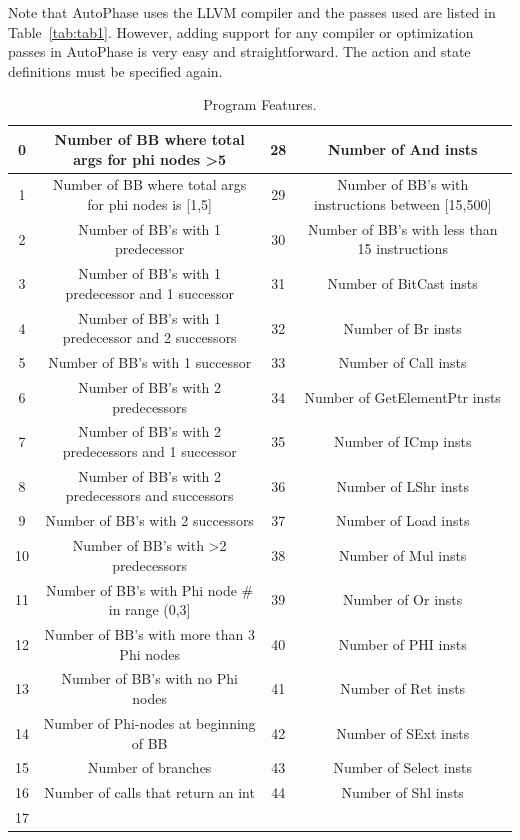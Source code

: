 Note that AutoPhase uses the LLVM compiler and the passes used are listed in Table~\ref{tab:tab1}. However, adding support for any compiler or optimization passes in AutoPhase is very easy and straightforward. The action and state definitions must be specified again. 

\begin{table}[!t]
\scriptsize
\centering
\caption{Program Features.}
\begin{tabular}{
|c|c|c|c|}
\hline 0&
Number of BB where total args for phi nodes \textgreater 5 & 28&  Number of And insts \\ \hline 1&
Number of BB where total args for phi nodes is {[}1,5{]} & 29&  Number of BB's with instructions between {[}15,500{]} \\ \hline 2&
Number of BB's with 1 predecessor & 30&  Number of BB's with less than 15 instructions \\ \hline 3&
Number of BB's with 1 predecessor and 1 successor & 31&  Number of BitCast insts \\ \hline 4&
Number of BB's with 1 predecessor and 2 successors & 32&  Number of Br insts \\ \hline 5&
Number of BB's with 1 successor & 33&  Number of Call insts \\ \hline 6&
Number of BB's with 2 predecessors & 34&  Number of GetElementPtr insts \\ \hline 7&
Number of BB's with 2 predecessors and 1 successor & 35&  Number of ICmp insts \\ \hline 8&
Number of BB's with 2 predecessors and successors & 36&  Number of LShr insts \\ \hline 9&
Number of BB's with 2 successors & 37&  Number of Load insts \\ \hline 10&
Number of BB's with \textgreater{}2 predecessors & 38&  Number of Mul insts \\ \hline 11&
Number of BB's with Phi node \# in range (0,3{]} & 39&  Number of Or insts \\ \hline 12&
Number of BB's with more than 3 Phi nodes & 40&  Number of PHI insts \\ \hline 13&
Number of BB's with no Phi nodes & 41&  Number of Ret insts \\ \hline 14&
Number of Phi-nodes at beginning of BB & 42&  Number of SExt insts \\ \hline 15&
Number of branches & 43&  Number of Select insts \\ \hline 16&
Number of calls that return an int & 44&  Number of Shl insts \\ \hline 17&

\end{tabular}
\end{table}
